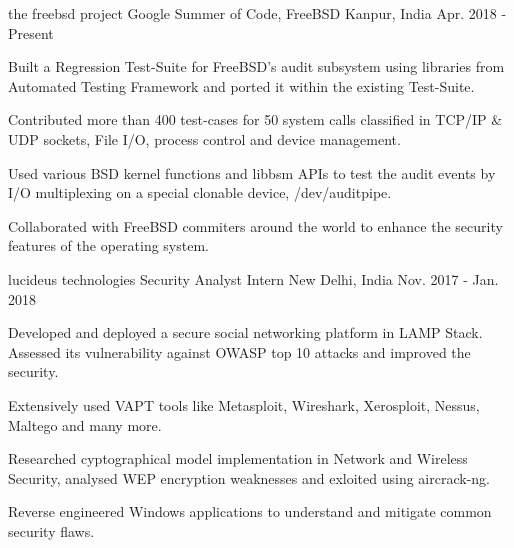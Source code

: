 


\begin{cventries}

    
  \cventry
    {the freebsd project}
    {Google Summer of Code, FreeBSD}
    {Kanpur, India}
    {Apr. 2018 - Present}
    {
      \begin{cvitems}
        \item Built a Regression Test-Suite for FreeBSD's audit subsystem using libraries from Automated Testing Framework and ported it within the existing Test-Suite. 
        \item Contributed more than 400 test-cases for 50 system calls classified in TCP/IP \& UDP sockets, File I/O, process control and device management.
        \item Used various BSD kernel functions and libbsm APIs to test the audit events by I/O multiplexing on a special clonable device, /dev/auditpipe.
        \item Collaborated with FreeBSD commiters around the world to enhance the security features of the operating system.  
      \end{cvitems}
    }
  
  \cventry
    {lucideus technologies}
    {Security Analyst Intern}
    {New Delhi, India}
    {Nov. 2017 - Jan. 2018}
    {
      \begin{cvitems}
        \item Developed and deployed a secure social networking platform in LAMP Stack. Assessed its vulnerability against OWASP top 10 attacks and improved the security. 
        \item Extensively used VAPT tools like Metasploit, Wireshark, Xerosploit, Nessus, Maltego and many more.
        \item Researched cyptographical model implementation in Network and Wireless Security, analysed WEP encryption weaknesses and exloited using aircrack-ng.
        \item Reverse engineered Windows applications to understand and mitigate common security flaws.  
      \end{cvitems}
    }


\end{cventries}
